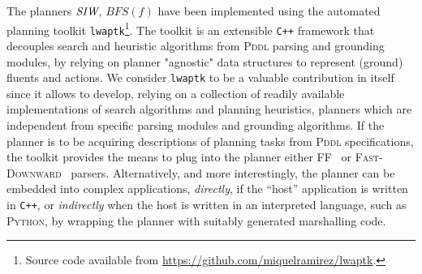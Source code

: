 The planners ${\textit{SIW}}$, $BFS(f)$ have been implemented using the automated planning
toolkit \texttt{lwaptk}\footnote{Source code available from
\url{https://github.com/miquelramirez/lwaptk}.}. The toolkit is an extensible \texttt{C++}
framework that decouples search and heuristic algorithms from \textsc{Pddl} parsing and grounding modules, by relying
on planner "agnostic" data structures to represent (ground) fluents and actions.
We consider \texttt{lwaptk} to be a valuable contribution in itself since it allows 
to develop, relying on a collection of readily available implementations of search algorithms and planning heuristics, 
planners which are independent from specific parsing modules and grounding algorithms. 
If the planner is to be acquiring descriptions of planning tasks from \textsc{Pddl} specifications, the toolkit
provides the means to plug into the planner either  \textsc{FF}~\cite{hoffmann:ff}
or \textsc{Fast-Downward}~\cite{helmert:fd} parsers. Alternatively, and more interestingly,
the planner can be embedded into complex applications, \emph{directly}, if the ``host'' application is written in 
\texttt{C++}, or \emph{indirectly} when the host is written in an interpreted language, such as \textsc{Python}, 
by wrapping the planner with suitably generated marshalling code.
